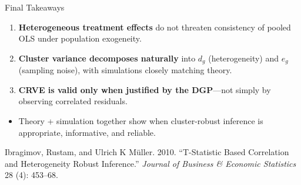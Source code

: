 \documentclass[
  ignorenonframetext,
]{beamer}
\newlength{\cslhangindent}
\newenvironment{CSLReferences}[2] %
 {\begin{list}{}{%
  \setlength{\itemindent}{0pt}
  \setlength{\leftmargin}{0pt}
  \setlength{\parsep}{0pt}
  \ifodd #1
   \setlength{\leftmargin}{\cslhangindent}
   \setlength{\itemindent}{-1\cslhangindent}
  \fi
  \setlength{\itemsep}{#2\baselineskip}}}
 {\end{list}}
\providecommand{\tightlist}{%
  \setlength{\itemsep}{0pt}\setlength{\parskip}{0pt}}
\begin{document}
\begin{frame}{Final Takeaways}
\label{final-takeaways}
\begin{enumerate}
\tightlist
\item
  \textbf{Heterogeneous treatment effects} do not threaten consistency
  of pooled OLS under population exogeneity.\\
\item
  \textbf{Cluster variance decomposes naturally} into \(d_g\)
  (heterogeneity) and \(e_g\) (sampling noise), with simulations closely
  matching theory.\\
\item
  \textbf{CRVE is valid only when justified by the DGP}---not simply by
  observing correlated residuals.
\end{enumerate}

\begin{itemize}
\tightlist
\item
  Theory + simulation together show when cluster-robust inference is
  appropriate, informative, and reliable.
\end{itemize}
\end{frame}

\begin{frame}
\label{refs}
\begin{CSLReferences}{1}{0}
Ibragimov, Rustam, and Ulrich K Müller. 2010. {``T-Statistic Based
Correlation and Heterogeneity Robust Inference.''} \emph{Journal of
Business \& Economic Statistics} 28 (4): 453--68.

\end{CSLReferences}
\end{frame}
\end{document}
